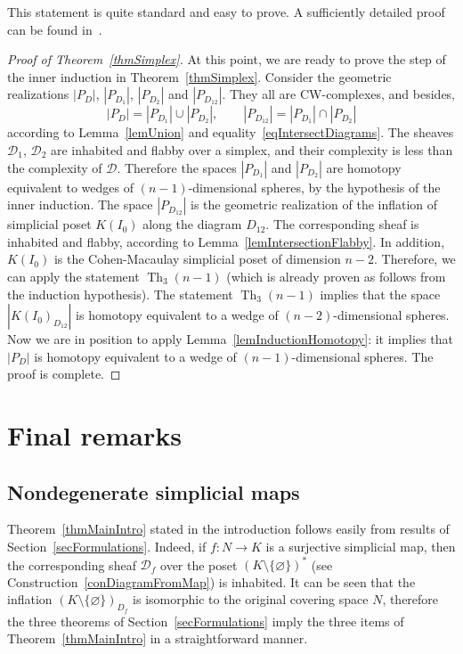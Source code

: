 \documentclass[english,12pt,oneside]{amsproc}
\DeclareMathOperator{\Th}{Th}
\newcommand{\ca}[1]{\mathcal{#1}}
\numberwithin{equation}{section}
\theoremstyle{plain}
\theoremstyle{definition}
\theoremstyle{remark}
\begin{document}
This statement is quite standard and easy to prove. A sufficiently detailed proof can be found in~\cite[Lm.4.1]{AyzRukh}.

\begin{proof}[Proof of Theorem~\ref{thmSimplex}]
At this point, we are ready to prove the step of the inner induction in Theorem~\ref{thmSimplex}. Consider the geometric realizations $|P_D|$, $|P_{D_1}|$, $|P_{D_2}|$ and $|P_{D_{12}}|$. They all are CW-complexes, and besides,
\[
|P_D|=|P_{D_1}|\cup |P_{D_2}|, \qquad |P_{D_{12}}|=|P_{D_1}|\cap |P_{D_2}|
\]
according to Lemma~\ref{lemUnion} and equality~\eqref{eqIntersectDiagrams}. The sheaves $\ca{D}_1$, $\ca{D}_2$ are inhabited and flabby over a simplex, and their complexity is less than the complexity of $\ca{D}$. Therefore the spaces $|P_{D_1}|$ and $|P_{D_2}|$ are homotopy equivalent to wedges of $(n-1)$-dimensional spheres, by the hypothesis of the inner induction. The space $|P_{D_{12}}|$ is the geometric realization of the inflation of simplicial poset $K(I_0)$ along the diagram $D_{12}$. The corresponding sheaf is inhabited and flabby, according to Lemma~\ref{lemIntersectionFlabby}. In addition, $K(I_0)$ is the Cohen-Macaulay simplicial poset of dimension $n-2$. Therefore, we can apply the statement $\Th_3(n-1)$ (which is already proven as follows from the induction hypothesis). The statement $\Th_3(n-1)$ implies that the space $|K(I_0)_{D_{12}}|$ is homotopy equivalent to a wedge of $(n-2)$-dimensional spheres. Now we are in position to apply Lemma~\ref{lemInductionHomotopy}: it implies that $|P_D|$ is homotopy equivalent to a wedge of $(n-1)$-dimensional spheres. The proof is complete.
\end{proof}

\section{Final remarks}\label{secFinalRemarks}

\subsection{Nondegenerate simplicial maps}
Theorem~\ref{thmMainIntro} stated in the introduction follows easily from results of Section~\ref{secFormulations}. Indeed, if $f\colon N\to K$ is a surjective simplicial map, then the corresponding sheaf $\ca{D}_f$ over the poset $(K\setminus\{\varnothing\})^*$ (see Construction~\ref{conDiagramFromMap}) is inhabited. It can be seen that the inflation $(K\setminus\{\varnothing\})_{D_f}$ is isomorphic to the original covering space $N$, therefore the three theorems of Section~\ref{secFormulations} imply the three items of Theorem~\ref{thmMainIntro} in a straightforward manner.
\end{document}
